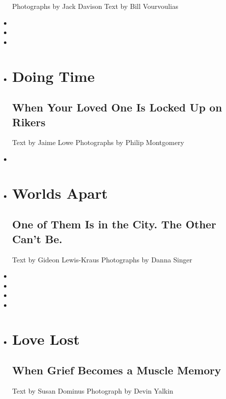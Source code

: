 \begin{itemize}
   Photographs by Jack Davison Text by Bill Vourvoulias 
\item
\item
\item
\item
  \href{https://www.nytimes3xbfgragh.onion/interactive/2018/06/07/magazine/new-york-love-rikers-jail-visit.html}{}

  \hypertarget{doing-time}{%
  \section{Doing Time}\label{doing-time}}

  \hypertarget{when-your-loved-one-is-locked-up-on-rikers}{%
  \subsection{When Your Loved One Is Locked Up on
  Rikers}\label{when-your-loved-one-is-locked-up-on-rikers}}

   Text by Jaime Lowe Photographs by Philip Montgomery 
\item
\item
  \href{https://www.nytimes3xbfgragh.onion/interactive/2018/06/07/magazine/new-york-love-separation.html}{}

  \hypertarget{worlds-apart}{%
  \section{Worlds Apart}\label{worlds-apart}}

  \hypertarget{one-of-them-is-in-the-city-the-other-cant-be}{%
  \subsection{One of Them Is in the City. The Other Can't
  Be.}\label{one-of-them-is-in-the-city-the-other-cant-be}}

   Text by Gideon Lewis-Kraus Photographs by Danna Singer 
\item
\item
\item
\item
\item
  \href{https://www.nytimes3xbfgragh.onion/interactive/2018/06/07/magazine/new-york-love-lost-husband-grief.html}{}

  \hypertarget{love-lost}{%
  \section{Love Lost}\label{love-lost}}

  \hypertarget{when-grief-becomes-a-muscle-memory}{%
  \subsection{When Grief Becomes a Muscle
  Memory}\label{when-grief-becomes-a-muscle-memory}}

   Text by Susan Dominus Photograph by Devin Yalkin 
\end{itemize}


